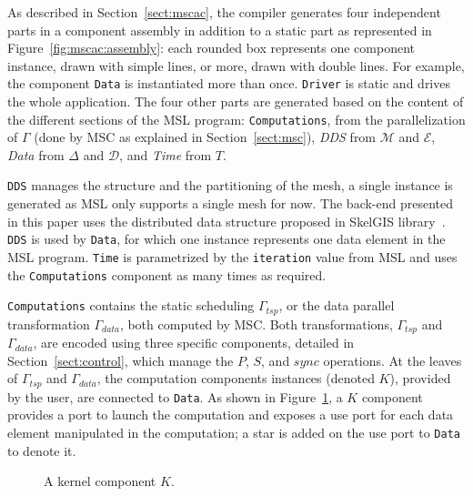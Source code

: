 As described in Section~\ref{sect:mscac}, the compiler generates four independent parts in a component assembly in addition to a static part as represented in Figure~\ref{fig:mscac:assembly}: each rounded box represents one component instance, drawn with simple lines, or more, drawn with double lines. For example, the component \texttt{Data} is instantiated more than once.
\texttt{Driver} is static and drives the whole application.
The four other parts are generated based on the content of the different sections of the MSL program: \texttt{Computations}, from the parallelization of $\Gamma$ (done by MSC as explained in Section~\ref{sect:msc}), \emph{DDS} from $\mathcal{M}$ and $\mathcal{E}$, \emph{Data} from $\Delta$ and $\mathcal{D}$, and \emph{Time} from $T$.


\texttt{DDS} manages the structure and the partitioning of the mesh, a single instance is generated as MSL only supports a single mesh for now.
The back-end presented in this paper uses the distributed data structure proposed in SkelGIS library~\cite{CPE:CPE3494}.
\texttt{DDS} is used by \texttt{Data}, for which one instance represents one data element in the MSL program.
\texttt{Time} is parametrized by the \texttt{iteration} value from MSL and uses the \texttt{Computations} component as many times as required.

\texttt{Computations} contains the static scheduling $\Gamma_{tsp}$, or the data parallel transformation $\Gamma_{data}$, both computed by MSC.
Both transformations, $\Gamma_{tsp}$ and $\Gamma_{data}$, are encoded using three specific components, detailed in Section~\ref{sect:control}, which manage the $P$, $S$, and $sync$ operations.
At the leaves of $\Gamma_{tsp}$ and $\Gamma_{data}$, the computation components instances (denoted $K$), provided by the user, are connected to \texttt{Data}.
As shown in Figure~\ref{fig:k}, a $K$ component provides a port to launch the computation and exposes a use port for each data element manipulated in the computation; a star is added on the use port to \texttt{Data} to denote it.
\begin{figure}
\begin{center}
\end{center}
\caption{A kernel component $K$.}
\label{fig:k}
\end{figure}


